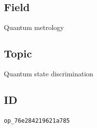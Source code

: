 \subsection*{Field}

Quantum metrology

\subsection*{Topic}

Quantum state discrimination

\subsection*{ID}

\texttt{op\_76e284219621a785}

